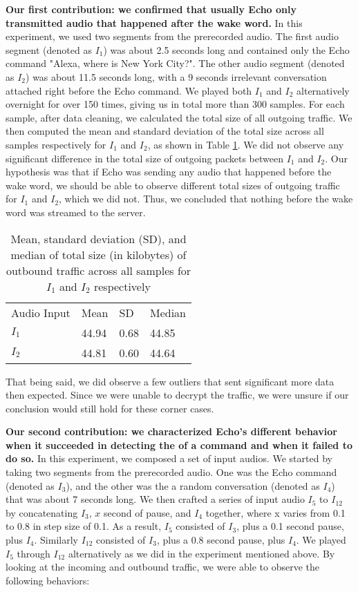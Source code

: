 \textbf{Our first contribution: we confirmed that usually Echo only transmitted audio that happened after the wake word.} In this experiment, we used two segments from the prerecorded audio. The first audio segment (denoted as $I_1$) was about 2.5 seconds long and contained only the Echo command "Alexa, where is New York City?". The other audio segment (denoted as $I_2$) was about 11.5 seconds long, with a 9 seconds irrelevant conversation attached right before the Echo command. We played both $I_1$ and $I_2$ alternatively overnight for over 150 times, giving us in total more than 300 samples. For each sample, after data cleaning, we calculated the total size of all outgoing traffic. We then computed the mean and standard deviation of the total size across all samples respectively for $I_1$ and $I_2$, as shown in Table \ref{table1}. We did not observe any significant difference in the total size of outgoing packets between $I_1$ and $I_2$. Our hypothesis was that if Echo was sending any audio that happened before the wake word, we should be able to observe different total sizes of outgoing traffic for $I_1$ and $I_2$, which we did not. Thus, we concluded that nothing before the wake word was streamed to the server.

\begin{table}[ht]
\caption{Mean, standard deviation (SD), and median of total size (in kilobytes) of outbound traffic across all samples for $I_1$ and $I_2$ respectively}
\begin{tabular}{l|l|l|l}
Audio Input & Mean & SD & Median \\
$I_1$ & 44.94 & 0.68 & 44.85\\
$I_2$ & 44.81 & 0.60 & 44.64\\
\end{tabular}
\label{table1}
\end{table}

That being said, we did observe a few outliers that sent significant more data then expected. Since we were unable to decrypt the traffic, we were unsure if our conclusion would still hold for these corner cases.

\textbf{Our second contribution: we characterized Echo's different behavior when it succeeded in detecting the of a command and when it failed to do so.} In this experiment, we composed a set of input audios. We started by taking two segments from the prerecorded audio. One was the Echo command (denoted as $I_3$), and the other was the a random conversation (denoted as $I_4$) that was about 7 seconds long. We then crafted a series of input audio $I_5$ to $I_{12}$ by concatenating $I_3$, $x$ second of pause, and $I_4$ together, where x varies from 0.1 to 0.8 in step size of 0.1. As a result, $I_5$ consisted of $I_3$, plus a 0.1 second pause, plus $I_4$. Similarly $I_{12}$ consisted of $I_3$, plus a 0.8 second pause, plus $I_4$. We played $I_5$ through $I_{12}$ alternatively as we did in the experiment mentioned above. By looking at the incoming and outbound traffic, we were able to observe the following behaviors: 

